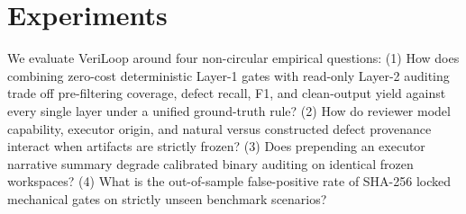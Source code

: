 \section{Experiments}
\label{sec:exp}

We evaluate VeriLoop around four non-circular empirical questions:
(1) How does combining zero-cost deterministic Layer-1 gates with read-only Layer-2 auditing trade off pre-filtering coverage, defect recall, F1, and clean-output yield against every single layer under a unified ground-truth rule?
(2) How do reviewer model capability, executor origin, and natural versus constructed defect provenance interact when artifacts are strictly frozen?
(3) Does prepending an executor narrative summary degrade calibrated binary auditing on identical frozen workspaces?
(4) What is the out-of-sample false-positive rate of SHA-256 locked mechanical gates on strictly unseen benchmark scenarios?

